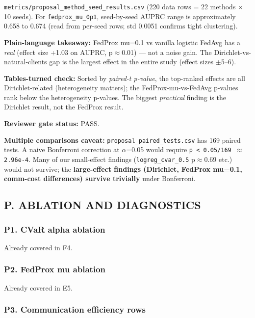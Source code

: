 \documentclass{article}
\begin{document}
\texttt{metrics/proposal\_method\_seed\_results.csv} (220 data rows = 22 methods \ensuremath{\times} 10 seeds). For \texttt{fedprox\_mu\_0p1}, seed-by-seed AUPRC range is approximately 0.658 to 0.674 (read from per-seed rows; std 0.0051 confirms tight clustering).


\textbf{Plain-language takeaway:} FedProx mu=0.1 vs vanilla logistic FedAvg has a \emph{real} (effect size +1.03 on AUPRC, p\ensuremath{\approx}0.01) --- not a noise gain. The Dirichlet-vs-natural-clients gap is the largest effect in the entire study (effect sizes \ensuremath{\pm}5--6).


\textbf{Tables-turned check:} Sorted by \emph{paired-t p-value}, the top-ranked effects are all Dirichlet-related (heterogeneity matters); the FedProx-mu-vs-FedAvg p-values rank below the heterogeneity p-values. The biggest \emph{practical} finding is the Dirichlet result, not the FedProx result.


\textbf{Reviewer gate status:} PASS.


\textbf{Multiple comparisons caveat:} \texttt{proposal\_paired\_tests.csv} has 169 paired tests. A naive Bonferroni correction at \ensuremath{\alpha}=0.05 would require \texttt{p < 0.05/169 \ensuremath{\approx} 2.96e-4}. Many of our small-effect findings (\texttt{logreg\_cvar\_0.5} p\ensuremath{\approx}0.69 etc.) would not survive; the \textbf{large-effect findings (Dirichlet, FedProx mu=0.1, comm-cost differences) survive trivially} under Bonferroni.


\subsection{P. ABLATION AND DIAGNOSTICS}


\subsubsection{P1. CVaR alpha ablation}


Already covered in F4.


\subsubsection{P2. FedProx mu ablation}


Already covered in E5.


\subsubsection{P3. Communication efficiency rows}
\end{document}
